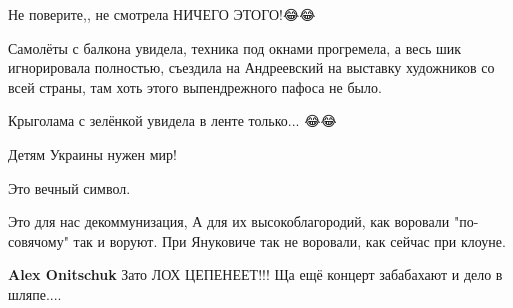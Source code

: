 \begin{itemize}
 

Не поверите,, не смотрела НИЧЕГО ЭТОГО!😂😂

Самолёты с балкона увидела, техника под окнами прогремела, а весь шик
игнорировала полностью, съездила на Андреевский на выставку художников со всей
страны, там хоть этого выпендрежного пафоса не было.

Крыголама с зелёнкой увидела в ленте только... 😂😂

 
Детям Украины нужен мир!

 
Это вечный символ.

 

Это для нас декоммунизация, А для их высокоблагородий, как воровали
"по-совячому" так и воруют. При Януковиче так не воровали, как сейчас при
клоуне.

\begin{itemize}
 
\textbf{Alex Onitschuk} Зато ЛОХ ЦЕПЕНЕЕТ!!!
Ща ещё концерт забабахают и дело в шляпе....

 

\end{itemize}
\end{itemize}
